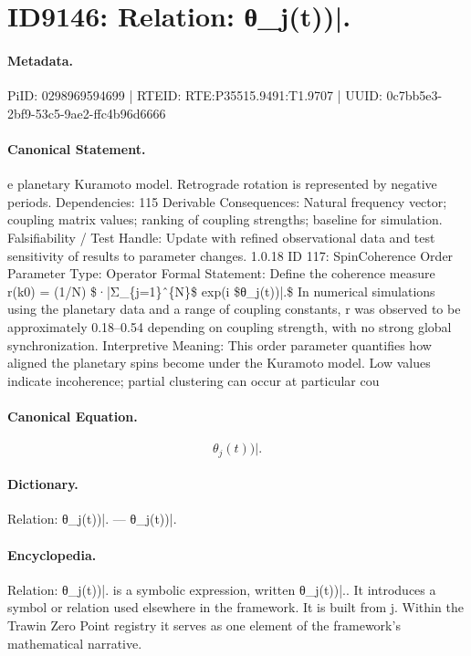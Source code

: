 \section*{ID9146: Relation: θ\_j(t))|.}
\paragraph{Metadata.}
PiID: 0298969594699 | RTEID: RTE:P35515.9491:T1.9707 | UUID: 0c7bb5e3-2bf9-53c5-9ae2-ffc4b96d6666

\paragraph{Canonical Statement.}
e planetary Kuramoto model. Retrograde rotation is represented by negative periods. Dependencies: 115 Derivable Consequences: Natural frequency vector; coupling matrix values; ranking of coupling strengths; baseline for simulation. Falsifiability / Test Handle: Update with refined observational data and test sensitivity of results to parameter changes. 1.0.18 ID 117: SpinCoherence Order Parameter Type: Operator Formal Statement: Define the coherence measure r(k0) = (1/N) \$·|Σ\_\{j=1\}ˆ\{N\}\$ exp(i \$θ\_j(t))|.\$ In numerical simulations using the planetary data and a range of coupling constants, r was observed to be approximately 0.18–0.54 depending on coupling strength, with no strong global synchronization. Interpretive Meaning: This order parameter quantifies how aligned the planetary spins become under the Kuramoto model. Low values indicate incoherence; partial clustering can occur at particular cou

\paragraph{Canonical Equation.}
\[
θ_j(t))|.
\]

\paragraph{Dictionary.}
Relation: θ\_j(t))|. — θ\_j(t))|.

\paragraph{Encyclopedia.}
Relation: θ\_j(t))|. is a symbolic expression, written θ\_j(t))|.. It introduces a symbol or relation used elsewhere in the framework. It is built from j. Within the Trawin Zero Point registry it serves as one element of the framework's mathematical narrative.
